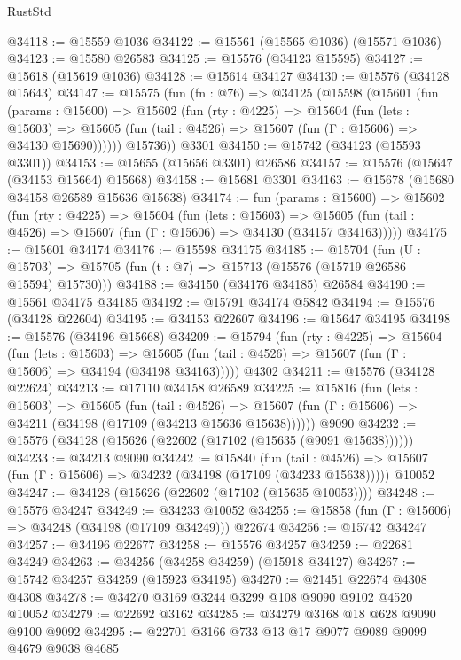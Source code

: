 \begin{lexlean}{RustStd}
\begin{coremodule}
@34118 := @15559 @1036
@34122 := @15561 (@15565 @1036) (@15571 @1036)
@34123 := @15580 @26583
@34125 := @15576 (@34123 @15595)
@34127 := @15618 (@15619 @1036)
@34128 := @15614 @34127
@34130 := @15576 (@34128 @15643)
@34147 := @15575
    (fun (fn : @76) =>
    @34125
      (@15598
        (@15601
          (fun (params : @15600) =>
          @15602
            (fun (rty : @4225) =>
            @15604
              (fun (lets : @15603) =>
              @15605 (fun (tail : @4526) => @15607 (fun (Γ : @15606) => @34130 @15690))))))
        @15736))
    @3301
@34150 := @15742 (@34123 (@15593 @3301))
@34153 := @15655 (@15656 @3301) @26586
@34157 := @15576 (@15647 (@34153 @15664) @15668)
@34158 := @15681 @3301
@34163 := @15678 (@15680 @34158 @26589 @15636 @15638)
@34174 := fun (params : @15600) =>
  @15602
    (fun (rty : @4225) =>
    @15604
      (fun (lets : @15603) =>
      @15605 (fun (tail : @4526) => @15607 (fun (Γ : @15606) => @34130 (@34157 @34163)))))
@34175 := @15601 @34174
@34176 := @15598 @34175
@34185 := @15704
    (fun (U : @15703) => @15705 (fun (t : @7) => @15713 (@15576 (@15719 @26586 @15594) @15730)))
@34188 := @34150 (@34176 @34185) @26584
@34190 := @15561 @34175 @34185
@34192 := @15791 @34174 @5842
@34194 := @15576 (@34128 @22604)
@34195 := @34153 @22607
@34196 := @15647 @34195
@34198 := @15576 (@34196 @15668)
@34209 := @15794
    (fun (rty : @4225) =>
    @15604
      (fun (lets : @15603) =>
      @15605 (fun (tail : @4526) => @15607 (fun (Γ : @15606) => @34194 (@34198 @34163)))))
    @4302
@34211 := @15576 (@34128 @22624)
@34213 := @17110 @34158 @26589
@34225 := @15816
    (fun (lets : @15603) =>
    @15605
      (fun (tail : @4526) =>
      @15607 (fun (Γ : @15606) => @34211 (@34198 (@17109 (@34213 @15636 @15638))))))
    @9090
@34232 := @15576 (@34128 (@15626 (@22602 (@17102 (@15635 (@9091 @15638))))))
@34233 := @34213 @9090
@34242 := @15840
    (fun (tail : @4526) => @15607 (fun (Γ : @15606) => @34232 (@34198 (@17109 (@34233 @15638)))))
    @10052
@34247 := @34128 (@15626 (@22602 (@17102 (@15635 @10053))))
@34248 := @15576 @34247
@34249 := @34233 @10052
@34255 := @15858 (fun (Γ : @15606) => @34248 (@34198 (@17109 @34249))) @22674
@34256 := @15742 @34247
@34257 := @34196 @22677
@34258 := @15576 @34257
@34259 := @22681 @34249
@34263 := @34256 (@34258 @34259) (@15918 @34127)
@34267 := @15742 @34257 @34259 (@15923 @34195)
@34270 := @21451 @22674 @4308 @4308
@34278 := @34270 @3169 @3244 @3299 @108 @9090 @9102 @4520 @10052
@34279 := @22692 @3162
@34285 := @34279 @3168 @18 @628 @9090 @9100 @9092
@34295 := @22701 @3166 @733 @13 @17 @9077 @9089 @9099 @4679 @9038 @4685

\end{coremodule}
\end{lexlean}
